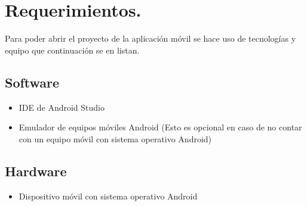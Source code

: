 \section{Requerimientos.}
Para poder abrir el proyecto de la aplicación móvil se hace uso de tecnologías y equipo que continuación se en listan.

\subsection{Software}
\begin{itemize}
    \item IDE de Android Studio
    \item Emulador de equipos móviles Android (Esto es opcional en caso de no contar con un equipo móvil con sistema operativo Android)
\end{itemize}


\subsection{Hardware}
\begin{itemize}
    \item Dispositivo móvil con sistema operativo Android
\end{itemize}